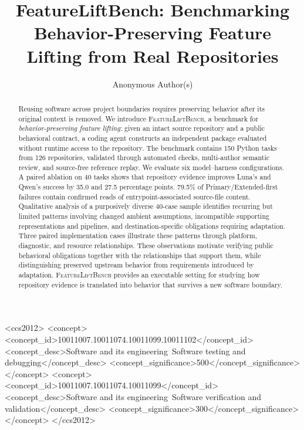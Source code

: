 \documentclass[acmsmall,screen,review,anonymous]{acmart}
\newcommand{\flb}{\textsc{FeatureLiftBench}\xspace}
\begin{document}
\title[FeatureLiftBench: Behavior-Preserving Feature Lifting]{FeatureLiftBench: Benchmarking Behavior-Preserving Feature Lifting from Real Repositories}
\author{Anonymous Author(s)}

\begin{abstract}
Reusing software across project boundaries requires preserving behavior after
its original context is removed. We introduce \flb, a benchmark for
\emph{behavior-preserving feature lifting}: given an intact source repository
and a public behavioral contract, a coding agent constructs an independent
package evaluated without runtime access to the repository. The benchmark
contains 150 Python tasks from 126 repositories, validated through automated
checks, multi-author semantic review, and source-free reference replay.
We evaluate six model--harness configurations. A paired ablation on 40 tasks shows
that repository evidence improves Luna's and Qwen's success by 35.0 and 27.5
percentage points. 79.5\% of Primary/Extended-first failures contain confirmed
reads of entrypoint-associated source-file content. Qualitative analysis of a
purposively diverse 40-case sample identifies recurring but limited patterns involving
changed ambient assumptions, incompatible supporting representations and
pipelines, and destination-specific obligations requiring adaptation.
Three paired implementation cases illustrate these patterns through platform,
diagnostic, and resource relationships. These observations motivate verifying public
behavioral obligations together with the relationships that support them,
while distinguishing preserved upstream behavior from requirements introduced
by adaptation. \flb provides an executable setting for studying how repository
evidence is translated into behavior that survives a new software boundary.
\end{abstract}

\begin{CCSXML}
<ccs2012>
 <concept><concept_id>10011007.10011074.10011099.10011102</concept_id>
 <concept_desc>Software and its engineering~Software testing and debugging</concept_desc>
 <concept_significance>500</concept_significance></concept>
 <concept><concept_id>10011007.10011074.10011099</concept_id>
 <concept_desc>Software and its engineering~Software verification and validation</concept_desc>
 <concept_significance>300</concept_significance></concept>
</ccs2012>
\end{CCSXML}
\maketitle
\end{document}
